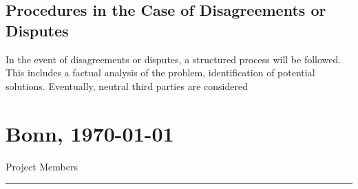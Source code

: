 \documentclass{article}
\begin{document}
\subsection{Procedures in the Case of Disagreements or Disputes}
In the event of disagreements or disputes, a structured process will be followed. This includes a factual analysis of the problem, identification of potential solutions. Eventually, neutral third parties are considered

\vfill
\section*{Bonn, \today}

\begin{minipage}{1\textwidth}
	\centering
	Project Members
	\hrule
\end{minipage}
\end{document}
